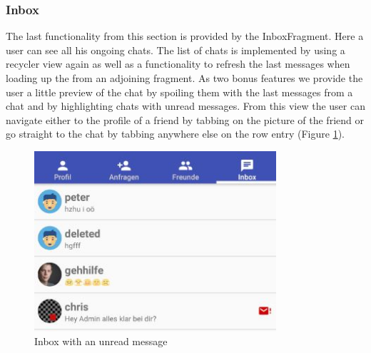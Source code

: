 \subsubsection{Inbox}
The last functionality from this section is provided by the InboxFragment. Here a user can see all his ongoing chats. The list of chats is implemented by using a recycler view again as well as a functionality to refresh the last messages when loading up the from an adjoining fragment. As two bonus features we provide the user a little preview of the chat by spoiling them with the last messages from a chat and by highlighting chats with unread messages. From this view the user can navigate either to the profile of a friend by tabbing on the picture of the friend or go straight to the chat by tabbing anywhere else on the row entry (Figure \ref{fig:inbox}).
\begin{figure}[htbp]
	\includegraphics[width=0.8\textwidth]{images/inbox.jpg}
	\centering
	\caption{Inbox with an unread message}\label{fig:inbox}
\end{figure} 

